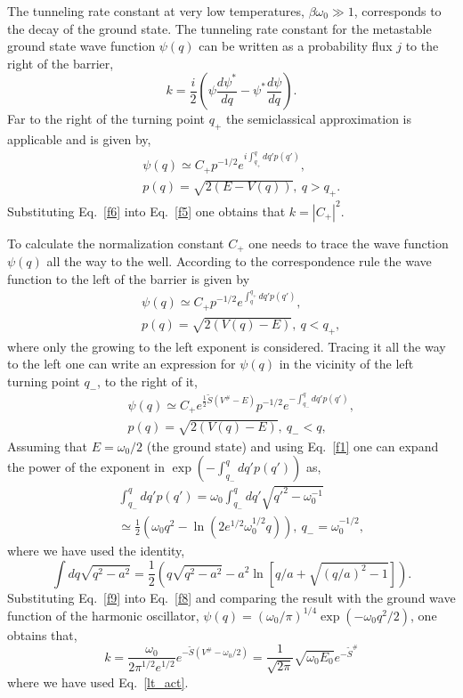 \documentclass[journal=jpcafh,manuscript=article]{achemso}
\begin{document}
The tunneling rate constant at very low temperatures,
$\beta\omega_0\gg1$, corresponds to the decay of the ground state.
The tunneling rate constant for the metastable ground state wave
function $\psi(q)$ can be written as a probability flux $j$ to the
right of the barrier,\cite{landau3}
\begin{equation}
  \label{f5}
  k=\frac{i}{2}\left(\psi\frac{d\psi^*}{dq}-\psi^*\frac{d\psi}{dq}\right).
\end{equation}
Far to the right of the turning point $q_+$ the semiclassical approximation is
applicable and is given by,\cite{landau3}
\begin{eqnarray}
  \label{f6}
  &&\psi(q)\simeq C_+p^{-1/2}e^{i\int_{q_+}^qdq'p(q')},
  \\
  \nonumber
  &&p(q)=\sqrt{2(E-V(q))},\ q>q_+.
\end{eqnarray}
Substituting Eq.~\ref{f6} into Eq.~\ref{f5} one obtains that
$k=|C_+|^2$.

To calculate the normalization constant $C_+$ one needs to trace the
wave function $\psi(q)$ all the way to the well. According to the correspondence
rule the wave function to the left of the barrier is given
by\cite{landau3}
\begin{eqnarray}
  \label{f7}
  &&\psi(q)\simeq C_+p^{-1/2}e^{\int^{q_+}_qdq'p(q')},
  \\
  \nonumber
  &&p(q)=\sqrt{2(V(q)-E)},\ q<q_+,
\end{eqnarray}
where only the growing to the left exponent is considered. Tracing it
all the way to the left one can write an expression for $\psi(q)$ in
the vicinity of the left turning point $q_-$, to
the right of it,
\begin{eqnarray}
  \label{f8}
  &&\psi(q)\simeq C_+e^{\frac{1}{2}\tilde{S}(V^\#-E)}p^{-1/2}e^{-\int_{q_-}^qdq'p(q')},
  \\
  \nonumber
  &&p(q)=\sqrt{2(V(q)-E)},\ q_-<q,
\end{eqnarray}
Assuming that $E=\omega_0/2$ (the ground state) and using Eq.~\ref{f1} one can expand the
power of the exponent in $\exp(-\int_{q_-}^qdq'p(q'))$ as,
\begin{eqnarray}
  \label{f9}
  &&\int_{q_-}^qdq'p(q') =\omega_0\int_{q_-}^qdq'\sqrt{q'^2-\omega_0^{-1}}
  \\
  \nonumber
  &&\simeq\frac{1}{2}(\omega_0q^2-\ln(2e^{1/2}\omega_0^{1/2}q)),\ q_-=\omega_0^{-1/2},
\end{eqnarray}
where we have used the identity,
\begin{equation}
  \label{f10}
  \int dq\sqrt{q^2-a^2}=\frac{1}{2}\left(q\sqrt{q^2-a^2}-a^2\ln\!\left[q/a+\sqrt{(q/a)^2-1}\right]\right).
\end{equation}
Substituting Eq.~\ref{f9} into Eq.~\ref{f8} and comparing the result
with the ground wave function of the harmonic
oscillator,\cite{landau3}
$\psi(q)=(\omega_0/\pi)^{1/4}\exp(-\omega_0q^2/2)$, one obtains that,
\begin{equation}
  \label{f11}
  k=\frac{\omega_0}{2\pi^{1/2}e^{1/2}}e^{-\tilde{S}(V^\#-\omega_0/2)}
  =\frac{1}{\sqrt{2\pi}}\sqrt{\omega_0E_0}e^{-\tilde{S}^\#}
\end{equation}
where we have used Eq.~\ref{lt_act}.
\end{document}
